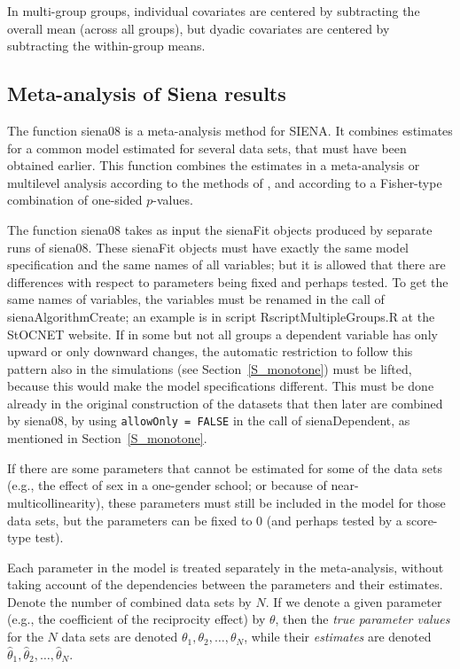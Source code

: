 \documentclass[a4paper,fleqn,11pt]{article}
\newcommand{\+}{\, + \,}
\newcommand{\SN}{{\sf StOCNET }}
\newcommand{\si}{{\sf SIENA}}
\begin{document}
In multi-group groups, individual covariates are centered by subtracting
the overall mean (across all groups), but dyadic covariates are centered
by subtracting the within-group means.



\subsection{Meta-analysis of Siena results}
\label{S_Siena08}

The function \textsf{siena08} is a meta-analysis method for \si.
It combines estimates for a common model
   estimated for several data sets,
   that must have been obtained earlier.
   This function combines
   the estimates in a meta-analysis or multilevel analysis
   according to the methods of \citet{SnijdersBaerveldt03},
   and according to a Fisher-type combination of one-sided $p$-values.

The function  \textsf{siena08} takes as input the \textsf{sienaFit}
objects produced by separate runs of  \textsf{siena08}.
These \textsf{sienaFit} objects must have exactly the same model
specification and the same names of all variables; but it is allowed
that there are differences with respect to parameters being fixed
and perhaps tested. To get the same names of variables, the
variables must be renamed in the call of \textsf{sienaAlgorithmCreate};
an example is in script \textsf{RscriptMultipleGroups.R} at the \SN website.
If in some but not all groups a dependent variable has only upward or
only downward changes, the automatic restriction to follow this pattern also
in the simulations (see Section~\ref{S_monotone}) must be lifted,
because this would make the model specifications different.
This must be done already in the original construction of the datasets that
then later are combined by \textsf{siena08},
by using \texttt{allowOnly = FALSE} in the call of \textsf{sienaDependent},
as mentioned in Section~\ref{S_monotone}.

If there are some parameters that cannot be estimated for some of the data sets
(e.g., the effect of sex in a one-gender school; or because of
near-multicollinearity), these parameters must still be included
in the model for those data sets, but the parameters can be fixed to 0
(and perhaps tested by a score-type test).
\medskip

Each parameter in the model is treated separately
in the meta-analysis, without taking account of the
dependencies between the parameters and their estimates.
Denote the number of combined data sets by $N$.
If we denote a given parameter (e.g., the
coefficient of the reciprocity effect) by $\theta$,
then the \emph{true parameter values} for the
$N$ data sets are denoted $\theta_1, \theta_2, \ldots, \theta_N$,
while their \emph{estimates} are denoted
 $\hat\theta_1, \hat\theta_2, \ldots, \hat\theta_N$.
 \bigskip
\end{document}
